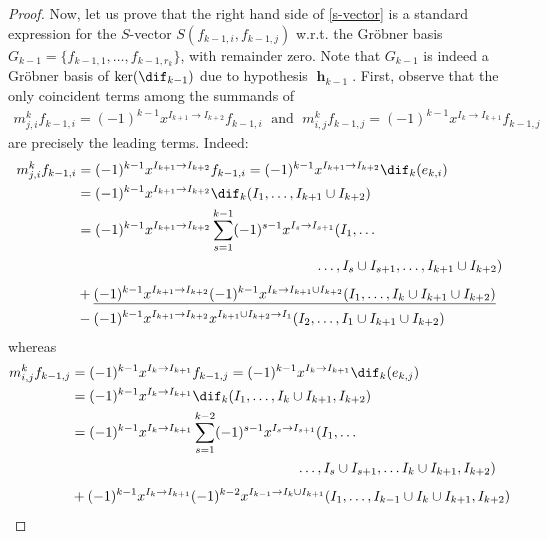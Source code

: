\begin{proof}
Now, let us prove that the right hand side of \eqref{s-vector} is a
standard expression for the $S$-vector $S(f_{k-1,i},f_{k-1,j})$
w.r.t. the Gr\"obner basis $G_{k-1}=\{f_{k-1,1},\ldots
,f_{k-1,r_{k}}\}$, with remainder zero. Note that $G_{k-1}$ is indeed
a Gr\"obner basis of $\ker(\dif_{k-1})$ due to hypothesis
$\mbfh_{k-1}$.  First, observe that the only coincident terms among
the summands of
\begin{eqnarray*}
m^{k}_{j,i}f_{k-1,i}=(-1)^{k-1}x^{I_{k+1}\to I_{k+2}}f_{k-1,i}\;\mbox{ and }\;
m^{k}_{i,j}f_{k-1,j}=(-1)^{k-1}x^{I_{k}\to I_{k+1}}f_{k-1,j}
\end{eqnarray*}
are precisely the leading terms. Indeed: 
\begin{align}\label{fi}
m^{k}_{j,i}f_{k-1,i}&=(-1)^{k-1}x^{I_{k+1}\to
  I_{k+2}}f_{k-1,i}=(-1)^{k-1}x^{I_{k+1}\to
  I_{k+2}}\dif_{k}(e_{k,i})\notag \\ 
&= (-1)^{k-1}x^{I_{k+1}\to
  I_{k+2}}\dif_{k}(I_1,\ldots ,I_{k+1}\cup
I_{k+2}) \notag \\
&= (-1)^{k-1}x^{I_{k+1}\to
  I_{k+2}}\sum_{s=1}^{k-1}(-1)^{s-1}x^{I_s\to I_{s+1}}(I_1,\ldots\\
&\phantom{(-1)^{k-1}x^{I_{k+1}\to
  I_{k+2}}\lim_{s=1}(-1)^{s-1}x^{I_s\to I_{s+1}}}\dots,I_s\cup I_{s+1},\ldots ,I_{k+1}\cup I_{k+2})\notag
\\
&+ \underline{(-1)^{k-1}x^{I_{k+1}\to I_{k+2}}(-1)^{k-1}x^{I_{k}\to
    I_{k+1}\cup I_{k+2}}(I_1,\ldots ,I_{k}\cup I_{k+1}\cup
  I_{k+2})}\notag \\ 
& -(-1)^{k-1}x^{I_{k+1}\to I_{k+2}}x^{I_{k+1}\cup I_{k+2}\to
  I_1}(I_2,\ldots,I_1\cup I_{k+1}\cup I_{k+2})\notag
\end{align}
whereas 
\begin{align}\label{fj}
 m^{k}_{i,j}f_{k-1,j}&=(-1)^{k-1}x^{I_{k}\to I_{k+1}}f_{k-1,j}=
  (-1)^{k-1}x^{I_{k}\to I_{k+1}}\dif_{k}(e_{k,j}) \notag \\ 
&=  (-1)^{k-1}x^{I_{k}\to I_{k+1}}\dif_{k}(I_1,\ldots ,I_{k}\cup
  I_{k+1},I_{k+2}) \notag \\
&= (-1)^{k-1}x^{I_{k}\to
    I_{k+1}}\sum_{s=1}^{k-2}(-1)^{s-1}x^{I_s\to I_{s+1}}(I_1,\ldots
  \\
	&\phantom{(-1)^{k-1}x^{I_{k}\to
    I_{k+1}}\lim_{s=1}(-1)^{s-1}x^{I_s\to I_{s+1}}}\ldots, I_s\cup I_{s+1}, \dots I_{k}\cup I_{k+1}, I_{k+2})\notag\\ 
&+  (-1)^{k-1}x^{I_{k}\to I_{k+1}}(-1)^{k-2}x^{I_{k-1}\to I_{k}\cup
    I_{k+1}} (I_1,\ldots , I_{k-1}\cup I_{k}\cup I_{k+1}, I_{k+2})\notag
 \\

\end{align}
\end{proof}
